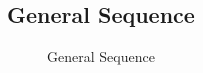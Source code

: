 \subsection{General Sequence}
\begin{figure}[hb]
    \centering
    \caption{General Sequence}
    \label{fig:seq-general}
\end{figure}